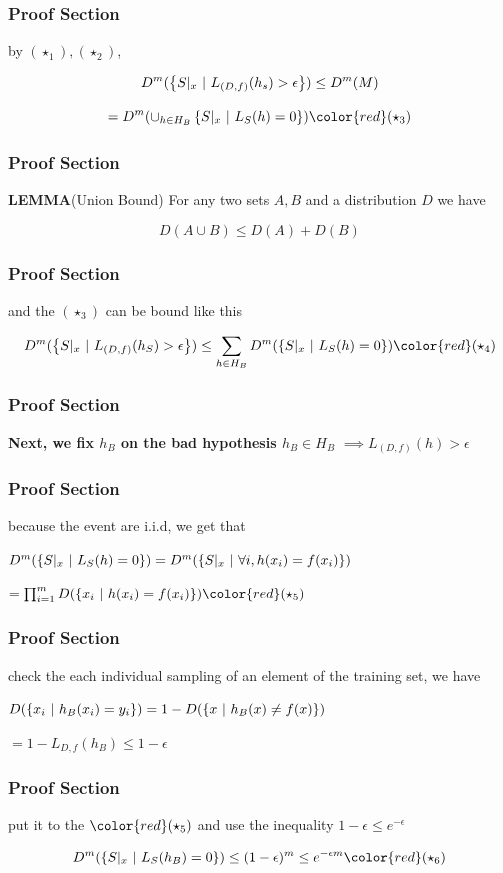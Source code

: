 \begin{frame}
	\frametitle{Proof Section}
	by $(\star_1),(\star_2)$,

$$D^m(\left\{S|_x~|~L_{(D,f)}(h_s)>\epsilon \right\}) \leq D^m(M) $$

$$= D^m(\cup_{h\in H_B}\sett{S|_x ~|~ L_S(h) = 0})\color{red}(\star_3)$$
	
\end{frame}


\begin{frame}
	\frametitle{Proof Section}
	\textbf{LEMMA}(Union Bound) For any two sets $A,B$ and a distribution $D$ we have

$$D(A\cup B) \leq D(A) + D(B)$$
	
\end{frame}


\begin{frame}
	\frametitle{Proof Section}
	and the $(\star_3)$ can be bound like this

$$D^m(\sett{S|_x ~|~ L_{(D,f)}(h_S)>\epsilon}) \leq \sum_{h \in H_B}D^m(\sett{S|_x ~|~ L_S(h) = 0})\color{red}(\star_4)$$
	
\end{frame}


\begin{frame}
	\frametitle{Proof Section}
	\textbf{Next, we fix $h_B$ on the bad hypothesis $h_B \in H_B$} $\implies L_{(D,f)}(h) > \epsilon$
	
\end{frame}


\begin{frame}
	\frametitle{Proof Section}
	because the event are i.i.d, we get that

$D^m(\left\{S|_x~|~L_S(h)=0 \right\}) = D^m(\left\{S|_x ~|~\forall i,h(x_i) = f(x_i) \right\})$

$ = \prod^m_{i=1}D(\sett{x_i~|~h(x_i) = f(x_i)})\color{red}(\star_5)$
	
\end{frame}


\begin{frame}
	\frametitle{Proof Section}
	check the each individual sampling of an element of the training set, we have

$D(\left\{x_i~|~h_B(x_i) = y_i \right\}) = 1-D(\left\{x ~|~ h_B(x) \neq f(x) \right\})$

$=1 - L_{D,f}(h_B) \leq 1 - \epsilon$
	
\end{frame}

\begin{frame}
	\frametitle{Proof Section}
	put it to the $\color{red}(\star_5)$ and use the inequality $1 - \epsilon \leq e^{-\epsilon}$

$$D^m(\sett{S|_x~|~ L_S(h_B) = 0}) \leq (1 -\epsilon)^m \leq e^{-\epsilon m}\color{red}(\star_6)$$
	
\end{frame}


